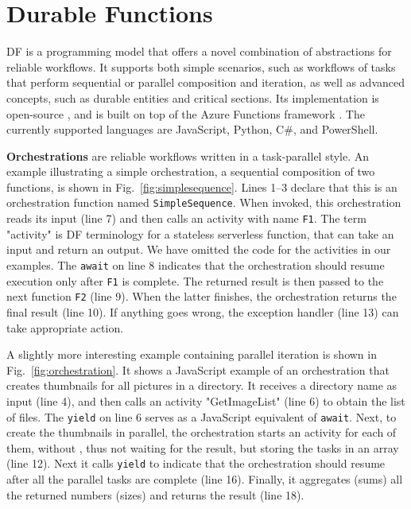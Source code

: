 \section{Durable Functions}\label{sec:durablefunctions}

DF is a programming model that offers a novel combination of abstractions for reliable workflows. It supports both simple scenarios, such as workflows of tasks that perform sequential or parallel composition and iteration, as well as advanced concepts, such as durable entities and critical sections. Its implementation is open-source \cite{df-extension-repo,df-js-repo,df-python-repo, df-powershell-repo}, and is built on top of the Azure Functions framework \cite{azure-functions-repo}. The currently supported languages are JavaScript, Python, C\#, and PowerShell.  

\vspace{.07in}\noindent\textbf{Orchestrations} 
are reliable workflows written in a task-parallel style. An example illustrating a simple orchestration, a sequential composition of two functions, is shown in Fig.~\ref{fig:simplesequence}. Lines 1--3 declare that this is an orchestration function named \texttt{SimpleSequence}. When invoked, this orchestration reads its input (line 7) and then calls an activity with name \texttt{F1}. The term "activity" is DF terminology for a stateless serverless function, that can take an input and return an output. We have omitted the code for the activities in our examples. The \texttt{await} on line 8 indicates that the orchestration should resume execution only after \texttt{F1} is complete. The returned result is then passed to the next function \texttt{F2} (line 9). When the latter finishes, the orchestration returns the final result (line 10). If anything goes wrong, the exception handler (line 13) can take appropriate action.

A slightly more interesting example containing parallel iteration is shown in Fig.~\ref{fig:orchestration}. It shows a JavaScript example of an orchestration that creates thumbnails for all pictures in a directory. It receives a directory name as input (line 4), and then calls an activity "GetImageList" (line 6) to obtain the list of files. The \texttt{yield} on line 6 serves as a JavaScript equivalent of \texttt{await}. Next, to create the thumbnails in parallel, the orchestration starts an activity for each of them, without , thus not waiting for the result, but storing the tasks in an array (line 12). Next it calls \texttt{yield} to indicate that the orchestration should resume after all the parallel tasks are complete (line 16). Finally, it aggregates (sums) all the returned numbers (sizes) and returns the result (line 18).
    
